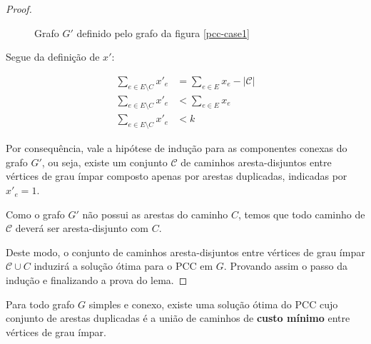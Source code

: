 \begin{proof}
\begin{figure}[H]
        \caption{Grafo $G'$ definido pelo grafo da figura \ref{pcc-case1}}
        \label{pcc-case3}
    \end{figure}

    Segue da definição de $x'$:

    \begin{align*}
        \sum_{e \in E \setminus C} x'_e &= \sum_{e \in E} x_e - |\mathcal{C}| \\ 
        \sum_{e \in E \setminus C} x'_e &< \sum_{e \in E} x_e \\
        \sum_{e \in E \setminus C} x'_e &< k
    \end{align*}

    Por consequência, vale a hipótese de indução para as componentes conexas do grafo $G'$, ou seja, existe um conjunto $\mathcal{C}$ de caminhos aresta-disjuntos entre vértices de grau ímpar composto apenas por arestas duplicadas, indicadas por $x'_e = 1$.

    Como o grafo $G'$ não possui as arestas do caminho $C$, temos que todo caminho de $\mathcal{C}$ deverá ser aresta-disjunto com $C$.
    
    Deste modo, o conjunto de caminhos aresta-disjuntos entre vértices de grau ímpar $\mathcal{C} \cup C$ induzirá a solução ótima para o PCC em $G$.
    Provando assim o passo da indução e finalizando a prova do lema.


\end{proof}

\begin{corollary}
    \label{lema-final}
    Para todo grafo $G$ simples e conexo, existe uma solução ótima do PCC cujo conjunto de arestas duplicadas é a união de caminhos de \textbf{custo mínimo} entre vértices de grau ímpar.
\end{corollary}

